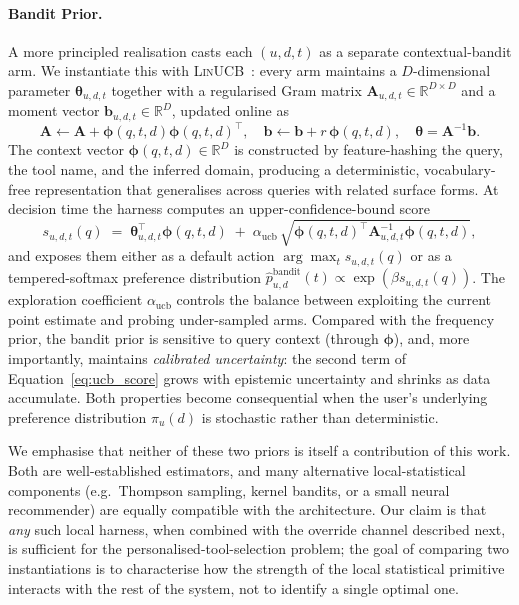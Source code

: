 \paragraph{Bandit Prior.}
A more principled realisation casts each $(u, d, t)$ as a separate
contextual-bandit arm. We instantiate this with
\textsc{LinUCB}~\citep{li2010linucb}: every arm maintains a $D$-dimensional
parameter $\boldsymbol{\theta}_{u,d,t}$ together with a regularised
Gram matrix $\mathbf{A}_{u,d,t}\in\mathbb{R}^{D\times D}$ and a moment
vector $\mathbf{b}_{u,d,t}\in\mathbb{R}^{D}$, updated online as
\begin{equation}
\mathbf{A} \leftarrow \mathbf{A} + \boldsymbol{\phi}(q,t,d)\boldsymbol{\phi}(q,t,d)^\top,
\quad
\mathbf{b} \leftarrow \mathbf{b} + r\,\boldsymbol{\phi}(q,t,d),
\quad
\boldsymbol{\theta} = \mathbf{A}^{-1}\mathbf{b}.
\label{eq:linucb_update}
\end{equation}
The context vector $\boldsymbol{\phi}(q,t,d)\in\mathbb{R}^{D}$ is
constructed by feature-hashing the query, the tool name, and the inferred
domain, producing a deterministic, vocabulary-free representation that
generalises across queries with related surface forms. At decision time
the harness computes an upper-confidence-bound score
\begin{equation}
s_{u,d,t}(q) \;=\;
\boldsymbol{\theta}_{u,d,t}^{\top}\boldsymbol{\phi}(q,t,d)
\;+\;
\alpha_{\mathrm{ucb}}\,
\sqrt{\boldsymbol{\phi}(q,t,d)^\top \mathbf{A}_{u,d,t}^{-1} \boldsymbol{\phi}(q,t,d)},
\label{eq:ucb_score}
\end{equation}
and exposes them either as a default action $\arg\max_t s_{u,d,t}(q)$ or
as a tempered-softmax preference distribution
$\hat p^{\mathrm{bandit}}_{u,d}(t)\propto\exp(\beta s_{u,d,t}(q))$.
The exploration coefficient $\alpha_{\mathrm{ucb}}$ controls the balance
between exploiting the current point estimate and probing under-sampled
arms. Compared with the frequency prior, the bandit prior is sensitive to
query context (through $\boldsymbol{\phi}$), and, more importantly,
maintains \emph{calibrated uncertainty}: the second term of
Equation~\eqref{eq:ucb_score} grows with epistemic uncertainty and shrinks
as data accumulate. Both properties become consequential when the user's
underlying preference distribution $\pi_u(d)$ is stochastic rather than
deterministic.

We emphasise that neither of these two priors is itself a contribution
of this work. Both are well-established estimators, and many alternative
local-statistical components (e.g.\ Thompson sampling, kernel bandits,
or a small neural recommender) are equally compatible with the
architecture. Our claim is that \emph{any} such local harness, when
combined with the override channel described next, is sufficient for
the personalised-tool-selection problem; the goal of comparing two
instantiations is to characterise how the strength of the local
statistical primitive interacts with the rest of the system, not to
identify a single optimal one.


